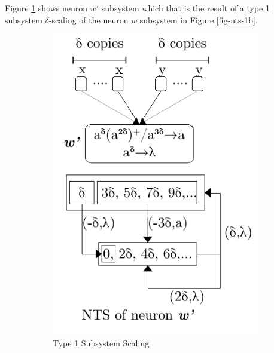\documentclass[]{elsarticle}
\theoremstyle{definition}
\theoremstyle{definition}
\begin{document}
Figure \ref{fig-nts-4a} shows neuron $w'$ subsystem which that is the result of a type 1 subsystem 
$\delta$-scaling of the neuron $w$ subsystem in Figure \ref{fig-nts-1b}.


\begin{figure}[H]
   \centering
   \begin{subfigure}{.49\textwidth}
      \centering
      \includegraphics[scale=0.65]{fig-lts-4a.pdf}
      \caption{Type 1 Subsystem Scaling}
      \label{fig-nts-4a}
   \end{subfigure}
   \begin{subfigure}{.49\textwidth}
      \centering

\end{subfigure}
\end{figure}
\end{document}
